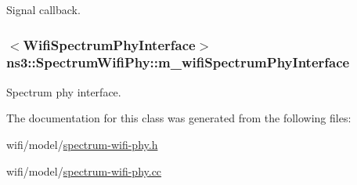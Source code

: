 Signal callback. 

\subsubsection[{\texorpdfstring{m\+\_\+wifi\+Spectrum\+Phy\+Interface}{m_wifiSpectrumPhyInterface}}]{$<${\bf Wifi\+Spectrum\+Phy\+Interface}$>$ ns3\+::\+Spectrum\+Wifi\+Phy\+::m\+\_\+wifi\+Spectrum\+Phy\+Interface\hspace{0.3cm}{\ttfamily [private]}}\hypertarget{classns3_1_1SpectrumWifiPhy_a8d4073a351a848f0a58bf05e83970564}{}\label{classns3_1_1SpectrumWifiPhy_a8d4073a351a848f0a58bf05e83970564}


Spectrum phy interface. 



The documentation for this class was generated from the following files\+:\begin{DoxyCompactItemize}
\item 
wifi/model/\hyperlink{spectrum-wifi-phy_8h}{spectrum-\/wifi-\/phy.\+h}\item 
wifi/model/\hyperlink{spectrum-wifi-phy_8cc}{spectrum-\/wifi-\/phy.\+cc}\end{DoxyCompactItemize}
